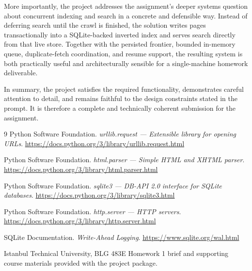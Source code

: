 \documentclass[pdftex,12pt,a4paper]{article}
\begin{document}
More importantly, the project addresses the assignment's deeper systems question about concurrent indexing and search in a concrete and defensible way. Instead of deferring search until the crawl is finished, the solution writes pages transactionally into a SQLite-backed inverted index and serves search directly from that live store. Together with the persisted frontier, bounded in-memory queue, duplicate-fetch coordination, and resume support, the resulting system is both practically useful and architecturally sensible for a single-machine homework deliverable.

In summary, the project satisfies the required functionality, demonstrates careful attention to detail, and remains faithful to the design constraints stated in the prompt. It is therefore a complete and technically coherent submission for the assignment.

\begin{thebibliography}{9}
Python Software Foundation. \textit{urllib.request --- Extensible library for opening URLs}. \url{https://docs.python.org/3/library/urllib.request.html}

Python Software Foundation. \textit{html.parser --- Simple HTML and XHTML parser}. \url{https://docs.python.org/3/library/html.parser.html}

Python Software Foundation. \textit{sqlite3 --- DB-API 2.0 interface for SQLite databases}. \url{https://docs.python.org/3/library/sqlite3.html}

Python Software Foundation. \textit{http.server --- HTTP servers}. \url{https://docs.python.org/3/library/http.server.html}

SQLite Documentation. \textit{Write-Ahead Logging}. \url{https://www.sqlite.org/wal.html}

Istanbul Technical University, BLG 483E Homework 1 brief and supporting course materials provided with the project package.
\end{thebibliography}
\end{document}
